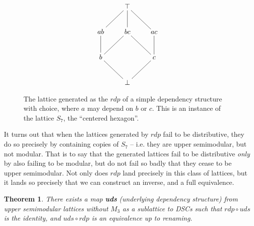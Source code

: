 \documentclass[hoptionsi,review,screen,format=sigconf]{acmart}
\newtheorem{theorem}{Theorem}[section]
\theoremstyle{definition}
\begin{document}
\begin{figure}
\begin{minipage}[c]{0.3\textwidth}
\begin{equation*}
    \xymatrix{& \top \ar@{-}[dl] \ar@{-}[d] \ar@{-}[dr] & \\
      ab \ar@{-}[d]& bc \ar@{-}[dl] \ar@{-}[dr] &
        ac \ar@{-}[d]  \\
        b \ar@{-}[dr]  & & c \ar@{-}[dl] \\
        & \bot &
        } 
\end{equation*}
\end{minipage}
\caption{The lattice generated as the \(rdp\) of a simple dependency structure with choice, where \(a\) may depend on \(b\) or \(c\). This is an instance of the lattice \(S_7\), the ``centered hexagon''.}
\label{Fig3}
\end{figure}

It turns out that when the lattices generated by \(rdp\) fail to be distributive, they do so precisely by containing copies of \(S_7\) -- i.e. they are upper semimodular, but not modular. That is to say that the generated lattices fail to be distributive \textit{only} by also failing to be modular, but do not fail so badly that they cease to be upper semimodular. Not only does \(rdp\) land precisely in this class of lattices, but it lands so precisely that we can construct an inverse, and a full equivalence.

\begin{theorem}
\label{representation}
There exists a map \textbf{uds} (underlying dependency structure) from upper semimodular lattices without \(M_3\) as a sublattice to DSCs such that  \(rdp \circ uds\) is the identity, and \(uds \circ rdp\) is an equivalence up to renaming.
\end{theorem}
\end{document}
